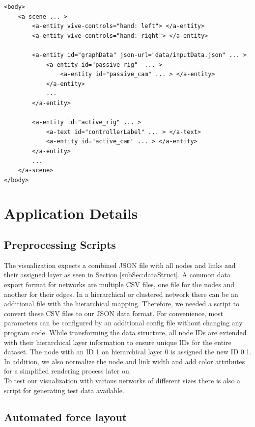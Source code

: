 \begin{lstlisting}[label={lst:virtualSceneGraph},caption=Simplified virtual A-Frame scene graph used by the application.]
<body>
    <a-scene ... >
        <a-entity vive-controls="hand: left"> </a-entity>
        <a-entity vive-controls="hand: right"> </a-entity>
        
        <a-entity id="graphData" json-url="data/inputData.json" ... >
            <a-entity id="passive_rig"  ... >  
                <a-entity id="passive_cam" ... > </a-entity>
            </a-entity>
            ...
        </a-entity>

        <a-entity id="active_rig" ... >
            <a-text id="controllerLabel" ... > </a-text>
            <a-entity id="active_cam" ... > </a-entity>
        </a-entity>
        ...
    </a-scene>
</body>
\end{lstlisting}

\section{Application Details}
\label{sec:applDetails}
\subsection{Preprocessing Scripts}
\label{sec:preprocessing}

The visualization expects a combined JSON file with all nodes and links and their assigned layer as seen in Section \ref{subSec:dataStruct}.
A common data export format for networks are multiple CSV files, one file for the nodes and another for their edges.
In a hierarchical or clustered network there can be an additional file with the hierarchical mapping.
Therefore, we needed a script to convert these CSV files to our JSON data format. For convenience, most parameters can be configured by an additional config file without changing any program code. 
While transforming the data structure, all node IDs are extended with their hierarchical layer information to ensure unique IDs for the entire dataset. The node with an ID 1 on hierarchical layer 0 is assigned the new ID 0.1.  
In addition, we also normalize the node and link width and add color attributes for a simplified rendering process later on.\\
To test our visualization with various networks of different sizes there is also a script for generating test data available.

\subsection{Automated force layout}
\label{sec:layoutCalculation}

